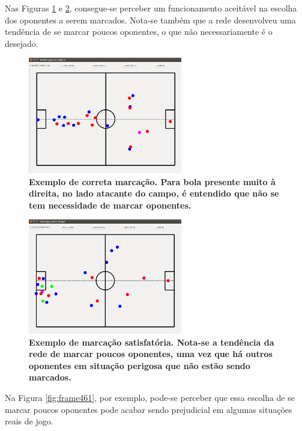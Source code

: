\documentclass[10pt,fleqn,a4paper]{article}
\begin{document}
	Nas Figuras \ref{fig:frame507} e \ref{fig:frame459}, consegue-se perceber um funcionamento aceitável na escolha dos oponentes a serem marcados. Nota-se também que a rede desenvolveu uma tendência de se marcar poucos oponentes, o que não necessariamente é o desejado.
	
\begin{figure}[H]
	\centering
	\includegraphics[width=0.6\textwidth]{figures/frame507.png}
   \caption{\textbf{Exemplo de correta marcação. Para bola presente muito à direita, no lado atacante do campo, é entendido que não se tem necessidade de marcar oponentes.}} \label{fig:frame507}
\end{figure}

\begin{figure}[H]
	\centering
	\includegraphics[width=0.6\textwidth]{figures/frame459.png}
   \caption{\textbf{Exemplo de marcação satisfatória. Nota-se a tendência da rede de marcar poucos oponentes, uma vez que há outros oponentes em situação perigosa que não estão sendo marcados.}} \label{fig:frame459}
\end{figure}

Na Figura \ref{fig:frame461}, por exemplo, pode-se perceber que essa escolha de se marcar poucos oponentes pode acabar sendo prejudicial em algumas situações reais de jogo.
\end{document}
